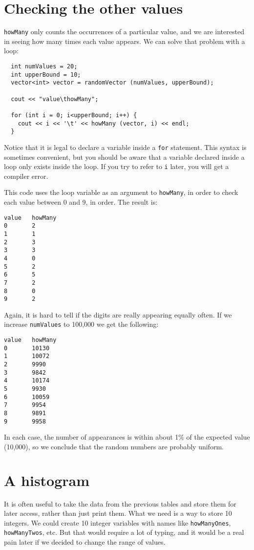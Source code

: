 \section{Checking the other values}

{\tt howMany} only counts the occurrences of a particular value, and
we are interested in seeing how many times each value appears.
We can solve that problem with a loop:

\begin{verbatim}
  int numValues = 20;
  int upperBound = 10;
  vector<int> vector = randomVector (numValues, upperBound);

  cout << "value\thowMany";

  for (int i = 0; i<upperBound; i++) {
    cout << i << '\t' << howMany (vector, i) << endl;
  }
\end{verbatim}
%
Notice that it is legal to declare a variable inside a {\tt for}
statement.  This syntax is sometimes convenient, but you should
be aware that a variable declared inside a loop only exists
inside the loop.  If you try to refer to {\tt i} later, you
will get a compiler error.

This code uses the loop variable as an argument to
{\tt howMany}, in order to check each value between 0 and 9,
in order.  The result is:

\begin{verbatim}
value   howMany
0       2
1       1
2       3
3       3
4       0
5       2
6       5
7       2
8       0
9       2
\end{verbatim}
%
Again, it is hard to tell if the digits are really appearing
equally often.  If we increase {\tt numValues} to 100,000 we
get the following:

\begin{verbatim}
value   howMany
0       10130
1       10072
2       9990
3       9842
4       10174
5       9930
6       10059
7       9954
8       9891
9       9958
\end{verbatim}
%
In each case, the number of appearances is within about 1\% of
the expected value (10,000), so we conclude that the random
numbers are probably uniform.

\section {A histogram}

It is often useful to take the data from the previous tables
and store them for later access, rather than just print them.
What we need is a way to store 10 integers.  We could create
10 integer variables with names like {\tt howManyOnes},
{\tt howManyTwos}, etc.  But that would require a lot of
typing, and it would be a real pain later if we decided to
change the range of values.


